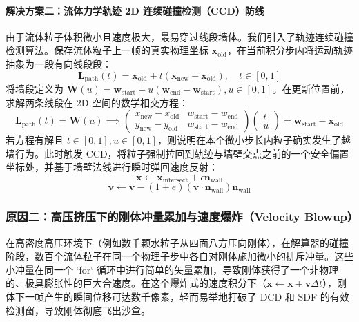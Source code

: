 \documentclass[11pt,a4paper]{article}
\begin{document}
\paragraph{解决方案二：流体力学轨迹 2D 连续碰撞检测（CCD）防线}
由于流体粒子体积微小且速度极大，最易穿过线段墙体。我们引入了轨迹连续碰撞检测算法。保存流体粒子上一帧的真实物理坐标 $\mathbf{x}_{\text{old}}$，在当前积分步内将运动轨迹抽象为一段有向线段段：
\begin{equation}
\mathbf{L}_{\text{path}}(t) = \mathbf{x}_{\text{old}} + t (\mathbf{x}_{\text{new}} - \mathbf{x}_{\text{old}}), \quad t \in [0, 1]
\end{equation}
将墙段定义为 $\mathbf{W}(u) = \mathbf{w}_{\text{start}} + u (\mathbf{w}_{\text{end}} - \mathbf{w}_{\text{start}}), u \in [0, 1]$。在更新位置前，求解两条线段在 2D 空间的数学相交方程：
\begin{equation}
\mathbf{L}_{\text{path}}(t) = \mathbf{W}(u) \implies \begin{pmatrix} x_{\text{new}} - x_{\text{old}} & w_{\text{start}} - w_{\text{end}} \\ y_{\text{new}} - y_{\text{old}} & w_{\text{start}} - w_{\text{end}} \end{pmatrix} \begin{pmatrix} t \\ u \end{pmatrix} = \mathbf{w}_{\text{start}} - \mathbf{x}_{\text{old}}
\end{equation}
若方程有解且 $t \in [0, 1], u \in [0, 1]$，则说明在本个微小步长内粒子确实发生了越墙行为。此时触发 CCD，将粒子强制拉回到轨迹与墙壁交点之前的一个安全偏置坐标处，并基于墙壁法线进行瞬时弹回速度反射：
\begin{equation}
\mathbf{x} \leftarrow \mathbf{x}_{\text{intersect}} + \epsilon \mathbf{n}_{\text{wall}}
\end{equation}
\begin{equation}
\mathbf{v} \leftarrow \mathbf{v} - (1 + e)(\mathbf{v} \cdot \mathbf{n}_{\text{wall}})\mathbf{n}_{\text{wall}}
\end{equation}

\subsubsection{原因二：高压挤压下的刚体冲量累加与速度爆炸（Velocity Blowup）}
在高密度高压环境下（例如数千颗水粒子从四面八方压向刚体），在解算器的碰撞阶段，数百个流体粒子在同一个物理子步中各自对刚体施加微小的排斥冲量。这些小冲量在同一个 `for` 循环中进行简单的矢量累加，导致刚体获得了一个非物理的、极具膨胀性的巨大合速度。在这个爆炸式的速度积分下（$\mathbf{x} \leftarrow \mathbf{x} + \mathbf{v} \Delta t$），刚体下一帧产生的瞬间位移可达数千像素，轻而易举地打破了 DCD 和 SDF 的有效检测窗，导致刚体彻底飞出沙盒。
\end{document}
